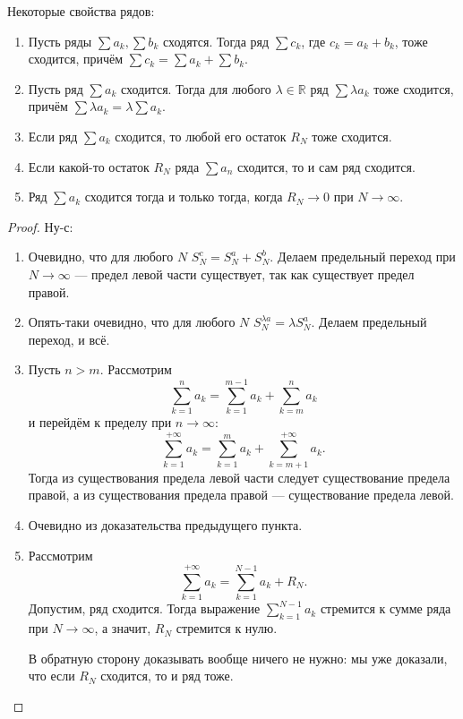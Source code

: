 \begin{theorem}
	Некоторые свойства рядов:
	\begin{enumerate}
		\item Пусть ряды  \(\sum a_k, \sum b_k\) сходятся. Тогда ряд \(\sum c_k\), где \(c_k = a_k + b_k\), тоже сходится, причём \(\sum c_k = \sum a_k + \sum b_k\).
		\item Пусть ряд \(\sum a_k\) сходится. Тогда для любого \(\lambda \in \mathbb{R}\) ряд \(\sum \lambda a_k\) тоже сходится, причём \(\sum \lambda a_k = \lambda \sum a_k\).
		\item Если ряд \(\sum a_k\) сходится, то любой его остаток \(R_N\) тоже сходится.
		\item Если какой-то остаток \(R_N\) ряда \(\sum a_n\) сходится, то и сам ряд сходится.
		\item Ряд \(\sum a_k\) сходится тогда и только тогда, когда \(R_N \to 0\) при \(N \to \infty\).
	\end{enumerate}
\end{theorem}
\begin{proof}
	Ну-с:
	\begin{enumerate}
		\item Очевидно, что для любого \(N\) \(S_N^c = S_N^a + S_N^b\). Делаем предельный переход при \(N \to \infty\) --- предел левой части существует, так как существует предел правой.
		\item Опять-таки очевидно, что для любого \(N\) \(S_N^{\lambda a} = \lambda S_N^a\). Делаем предельный переход, и всё.
		\item Пусть \(n > m\). Рассмотрим \[
		\sum_{k=1}^{n} a_k = \sum_{k=1}^{m-1} a_k + \sum_{k=m}^{n} a_k
		\]
		и перейдём к пределу при \(n \to \infty\): \[
		\sum_{k=1}^{+\infty} a_k = \sum_{k=1}^{m} a_k + \sum_{k=m+1}^{+\infty} a_k.
		\]
		Тогда из существования предела левой части следует существование предела правой, а из существования предела правой --- существование предела левой.
		\item Очевидно из доказательства предыдущего пункта.
		\item Рассмотрим \[
		\sum_{k=1}^{+\infty} a_k = \sum_{k=1}^{N-1} a_k + R_N.
		\]
		Допустим, ряд сходится. Тогда выражение \(\sum\limits_{k=1}^{N-1} a_k\) стремится к сумме ряда при \(N \to \infty\), а значит, \(R_N\) стремится к нулю.
		
		В обратную сторону доказывать вообще ничего не нужно: мы уже доказали, что если \(R_N\) сходится, то и ряд тоже.
	\end{enumerate}
\end{proof}

